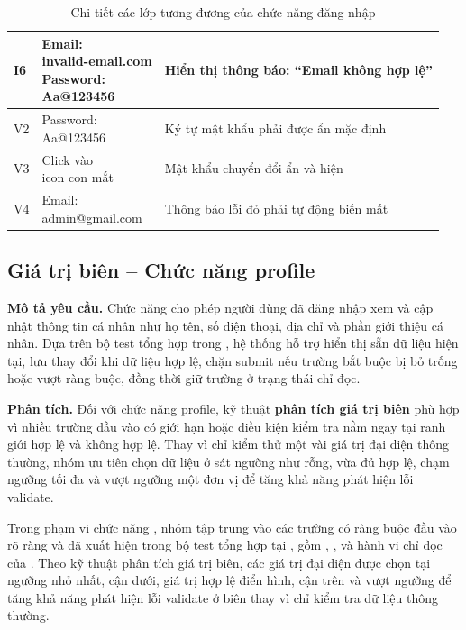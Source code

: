\begin{table}[H]
\begin{tabularx}{\textwidth}{|>{\centering\arraybackslash}p{1.6cm}|>{\raggedright\arraybackslash}p{3.8cm}|>{\raggedright\arraybackslash}X|}
		I6                & \makecell[l]{Email:                                \\invalid-email.com\\Password:\\Aa@123456} & Hiển thị thông báo: ``Email không hợp lệ'' \\
		\hline
		V2                & \makecell[l]{Password:                             \\Aa@123456} & Ký tự mật khẩu phải được ẩn mặc định \\
		\hline
		V3                & \makecell[l]{Click vào                             \\icon con mắt} & Mật khẩu chuyển đổi ẩn và hiện \\
		\hline
		V4                & \makecell[l]{Email:                                \\admin@gmail.com} & Thông báo lỗi đỏ phải tự động biến mất \\
		\hline
	\end{tabularx}
	\caption{Chi tiết các lớp tương đương của chức năng đăng nhập}
\end{table}

\subsection{Giá trị biên -- Chức năng profile}
\textbf{Mô tả yêu cầu.} Chức năng  cho phép người dùng đã đăng nhập xem và cập nhật thông tin cá nhân như họ tên, số điện thoại, địa chỉ và phần giới thiệu cá nhân. Dựa trên bộ test tổng hợp trong , hệ thống hỗ trợ hiển thị sẵn dữ liệu hiện tại, lưu thay đổi khi dữ liệu hợp lệ, chặn submit nếu trường bắt buộc bị bỏ trống hoặc vượt ràng buộc, đồng thời giữ trường  ở trạng thái chỉ đọc.

\textbf{Phân tích.} Đối với chức năng profile, kỹ thuật \textbf{phân tích giá trị biên} phù hợp vì nhiều trường đầu vào có giới hạn hoặc điều kiện kiểm tra nằm ngay tại ranh giới hợp lệ và không hợp lệ. Thay vì chỉ kiểm thử một vài giá trị đại diện thông thường, nhóm ưu tiên chọn dữ liệu ở sát ngưỡng như rỗng, vừa đủ hợp lệ, chạm ngưỡng tối đa và vượt ngưỡng một đơn vị để tăng khả năng phát hiện lỗi validate.

Trong phạm vi chức năng , nhóm tập trung vào các trường có ràng buộc đầu vào rõ ràng và đã xuất hiện trong bộ test tổng hợp tại , gồm , ,  và hành vi chỉ đọc của . Theo kỹ thuật phân tích giá trị biên, các giá trị đại diện được chọn tại ngưỡng nhỏ nhất, cận dưới, giá trị hợp lệ điển hình, cận trên và vượt ngưỡng để tăng khả năng phát hiện lỗi validate ở biên thay vì chỉ kiểm tra dữ liệu thông thường.

